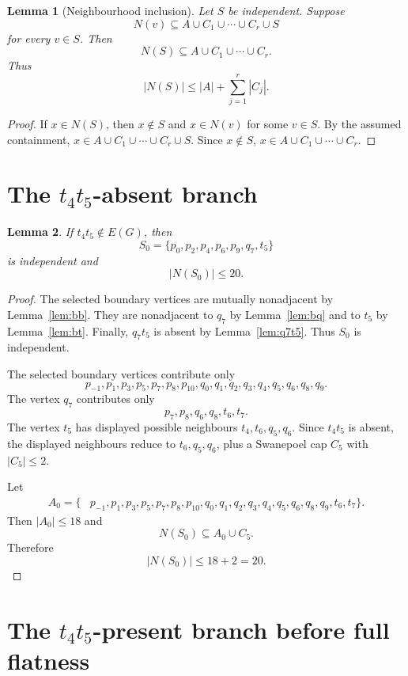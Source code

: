 \documentclass[11pt]{article}
\theoremstyle{plain}
\newtheorem{lemma}{Lemma}
\numberwithin{equation}{section}
\begin{document}
\begin{lemma}[Neighbourhood inclusion]\label{lem:neighincl}
Let $S$ be independent. Suppose
\[
 N(v)\subseteq A\cup C_1\cup\cdots\cup C_r\cup S
\]
for every $v\in S$. Then
\[
 N(S)\subseteq A\cup C_1\cup\cdots\cup C_r.
\]
Thus
\[
 |N(S)|\le |A|+\sum_{j=1}^r |C_j|.
\]
\end{lemma}

\begin{proof}
If $x\in N(S)$, then $x\notin S$ and $x\in N(v)$ for some $v\in S$. By the assumed containment, $x\in A\cup C_1\cup\cdots\cup C_r\cup S$. Since $x\notin S$, $x\in A\cup C_1\cup\cdots\cup C_r$.
\end{proof}

\section{The \texorpdfstring{$t_4t_5$}{t4t5}-absent branch}

\begin{lemma}\label{lem:S0}
If $t_4t_5\notin E(G)$, then
\[
 S_0=\{p_0,p_2,p_4,p_6,p_9,q_7,t_5\}
\]
is independent and
\[
 |N(S_0)|\le20.
\]
\end{lemma}

\begin{proof}
The selected boundary vertices are mutually nonadjacent by Lemma~\ref{lem:bb}. They are nonadjacent to $q_7$ by Lemma~\ref{lem:bq} and to $t_5$ by Lemma~\ref{lem:bt}. Finally, $q_7t_5$ is absent by Lemma~\ref{lem:q7t5}. Thus $S_0$ is independent.

The selected boundary vertices contribute only
\[
 p_{-1},p_1,p_3,p_5,p_7,p_8,p_{10},
 q_0,q_1,q_2,q_3,q_4,q_5,q_6,q_8,q_9.
\]
The vertex $q_7$ contributes only
\[
 p_7,p_8,q_6,q_8,t_6,t_7.
\]
The vertex $t_5$ has displayed possible neighbours $t_4,t_6,q_5,q_6$. Since $t_4t_5$ is absent, the displayed neighbours reduce to $t_6,q_5,q_6$, plus a Swanepoel cap $C_5$ with $|C_5|\le2$.

Let
\[
\begin{aligned}
A_0=\{&p_{-1},p_1,p_3,p_5,p_7,p_8,p_{10},q_0,q_1,q_2,q_3,q_4,q_5,q_6,q_8,q_9,t_6,t_7\}.
\end{aligned}
\]
Then $|A_0|\le18$ and
\[
 N(S_0)\subseteq A_0\cup C_5.
\]
Therefore
\[
 |N(S_0)|\le18+2=20.
\]
\end{proof}

\section{The \texorpdfstring{$t_4t_5$}{t4t5}-present branch before full flatness}
\end{document}
